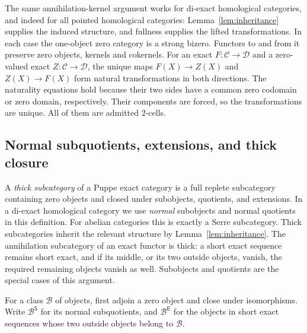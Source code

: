 \documentclass[11pt,reqno,a4paper]{amsart}
\theoremstyle{definition}
\theoremstyle{remark}
\newcommand{\C}{\mathcal{C}}
\newcommand{\D}{\mathcal{D}}
\newcommand{\0}{\mathbf{0}}
\renewcommand{\1}{\mathbf{1}}
\begin{document}
The same annihilation-kernel argument works for di-exact homological
categories, and indeed for all pointed homological categories:
Lemma~\ref{lem:inheritance} supplies the induced structure, and
fullness supplies the lifted transformations. In each case the
one-object zero category is a strong bizero. Functors to and from
it preserve zero objects, kernels and cokernels. For an exact
$F:\C\to\D$ and a zero-valued exact $Z:\C\to\D$, the unique
maps $F(X)\to Z(X)$ and $Z(X)\to F(X)$ form natural
transformations in both directions. The naturality equations hold
because their two sides have a common zero codomain or zero domain,
respectively. Their components are forced, so the transformations
are unique. All of them are admitted $2$-cells.

\subsection{Normal subquotients, extensions, and thick closure}

A \emph{thick subcategory} of a Puppe exact category is a full replete
subcategory containing zero objects and closed under subobjects,
quotients, and extensions. In a di-exact homological category we use
\emph{normal} subobjects and normal quotients in this definition.
For abelian categories this is exactly a Serre subcategory. Thick
subcategories inherit the relevant structure by
Lemma~\ref{lem:inheritance}. The annihilation subcategory of an exact
functor is thick: a short exact sequence remains short exact, and
if its middle, or its two outside objects, vanish, the required
remaining objects vanish as well. Subobjects and quotients are the
special cases of this argument.

For a class $\mathcal B$ of objects, first adjoin a zero object and
close under isomorphisms. Write $\mathcal B^{\mathsf S}$ for its
normal subquotients, and $\mathcal B^{\mathsf E}$ for the objects
in short exact sequences whose two outside objects belong to
$\mathcal B$.
\end{document}

